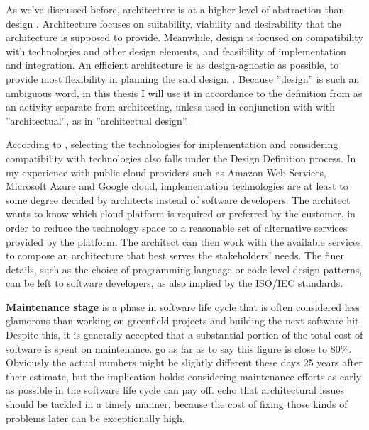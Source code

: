 \documentclass[utf8,english]{gradu3}
\begin{document}
As we've discussed before, architecture is at a higher level of abstraction than
design \parencite{IEEE12207}. Architecture focuses on suitability, viability and
desirability that the architecture is supposed to provide. Meanwhile, design is
focused on compatibility with technologies and other design elements, and
feasibility of implementation and integration. An efficient architecture is as
design-agnostic as possible, to provide most flexibility in planning the said
design. \parencite[71]{IEEE12207}. Because ''design'' is such an ambiguous word,
in this thesis I will use it in accordance to the definition from
\textcite{IEEE12207} as an activity separate from architecting, unless used in
conjunction with with ''architectual'', as in ''architectual design''.

According to \textcite[71-72]{IEEE12207}, selecting the technologies for
implementation and considering compatibility with technologies also falls under
the Design Definition process. In my experience with public cloud providers such
as Amazon Web Services, Microsoft Azure and Google cloud, implementation
technologies are at least to some degree decided by architects instead of
software developers. The architect wants to know which cloud platform is
required or preferred by the customer, in order to reduce the technology space
to a reasonable set of alternative services provided by the platform. The
architect can then work with the available services to compose an architecture
that best serves the stakeholders' needs. The finer details, such as the choice
of programming language or code-level design patterns, can be left to software
developers, as also implied by the ISO/IEC standards.

\textbf{Maintenance stage} is a phase in software life cycle that is often
considered less glamorous than working on greenfield projects and building the
next software hit. Despite this, it is generally accepted that a substantial
portion of the total cost of software is spent on maintenance.
\textcite[32]{Bass1998} go as far as to say this figure is close to 80\%.
Obviously the actual numbers might be slightly different these days 25 years
after their estimate, but the implication holds: considering maintenance efforts
as early as possible in the software life cycle can pay off.
\textcite[1]{Mumtaz2021} echo that architectural issues should be tackled in a
timely manner, because the cost of fixing those kinds of problems later can be
exceptionally high.
\end{document}
